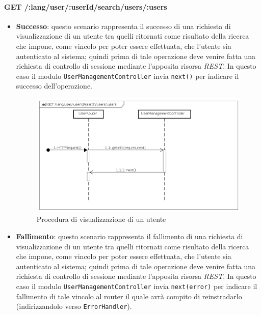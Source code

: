 \paragraph{GET /:lang/user/:userId/search/users/:users}
\begin{itemize}
\item \textbf{Successo}: questo scenario rappresenta il successo di una richiesta di visualizzazione di un utente tra quelli ritornati come risultato della ricerca che impone, come vincolo per poter essere effettuata, che l'utente sia autenticato al sistema; quindi prima di tale operazione deve venire fatta una richiesta di controllo di sessione mediante l'apposita risorsa \textit{REST}. In questo caso il modulo \texttt{UserManagementController} invia \texttt{next()} per indicare il successo dell'operazione.

\begin{figure}[ht]
	\centering
	\includegraphics[scale=0.45]{UML/DiagrammiDiSequenza/Back-end/GET__lang_user__userId_search_users__users_success.png}
	\caption{Procedura di visualizzazione di un utente}
\end{figure}
\FloatBarrier

\item \textbf{Fallimento}: questo scenario rappresenta il fallimento di una richiesta di visualizzazione di un utente tra quelli ritornati come risultato della ricerca che impone, come vincolo per poter essere effettuata, che l'utente sia autenticato al sistema; quindi prima di tale operazione deve venire fatta una richiesta di controllo di sessione mediante l'apposita risorsa \textit{REST}. In questo caso il modulo \texttt{UserManagementController} invia \texttt{next(error)} per indicare il fallimento di tale vincolo al router il quale avrà compito di reinstradarlo (indirizzandolo verso \texttt{ErrorHandler}).


\end{itemize}
